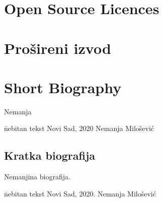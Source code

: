 \documentclass[b5paper]{book}
\let\cite\parencite
\newcommand{\skica}[1]{
    \noindent \framebox{\parbox[c]{0.9\textwidth}{  {\small** {#1}  }}
    \newline }
}
\begin{document}
\chapter{Open Source Licences}
\backmatter


{
  \raggedright
  \printbibliography[heading=bibintoc]
}


\chapter{Prošireni izvod}




\chapter{Short Biography}


Nemanja \cite{novak2010comparison}

\vfill


\begin{tabbing}
  \hspace{0.7\textwidth} \= nebitan tekst \kill
  Novi Sad, 2020 \> Nemanja Milošević
\end{tabbing}

\begin{otherlanguage}{english}
\chapter{Kratka biografija}

Nemanjina biografija.

\vfill


\begin{tabbing}
  \hspace{0.7\textwidth} \= nebitan tekst \kill
  Novi Sad, 2020. \> Nemanja Milošević\\
  \\
  \> \makebox[0.3\textwidth]{\dotfill}
\end{tabbing}

\end{otherlanguage}


\end{document}
